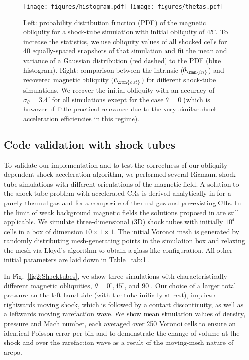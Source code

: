 \documentclass[8pt,a4paper,usenatbib]{mnras}
\newcommand{\AREPO}{{\sc arepo}\xspace}
\begin{document}
\begin{figure*}
\centering
\texttt{[image: figures/histogram.pdf]} 
\texttt{[image: figures/thetas.pdf]} 
\caption{Left: probability distribution function (PDF) of the magnetic obliquity
  for a shock-tube simulation with initial obliquity of $45^\circ$. To increase
  the statistics, we use obliquity values of all shocked cells for 40
  equally-spaced snapshots of that simulation and fit the mean and variance of a
  Gaussian distribution (red dashed) to the PDF (blue histogram).  Right:
  comparison between the intrinsic ($\theta_\rmn{in}$) and recovered magnetic
  obliquity ($\theta_\rmn{out}$) for different shock-tube simulations. We
  recover the initial obliquity with an accuracy of $\sigma_\theta=3.4^\circ$
  for all simulations except for the case $\theta=0$ (which is however of little
  practical relevance due to the very similar shock acceleration efficiencies in
  this regime). }
\label{fig3:statistics}
\end{figure*} 


\subsection{Code validation with shock tubes}

To validate our implementation and to test the correctness of our obliquity
dependent shock acceleration algorithm, we performed several Riemann shock-tube
simulations with different orientations of the magnetic field. A solution to the
shock-tube problem with accelerated CRs is derived analytically in
\citet{2017MNRAS.465.4500P} for a purely thermal gas and for a composite of
thermal gas and pre-existing CRs. In the limit of weak background magnetic
fields the solutions proposed in \citet{2017MNRAS.465.4500P} are still
applicable. We simulate three-dimensional (3D) shock tubes with initially $10^4$
cells in a box of dimension $10\times1\times1$. The initial Voronoi mesh is
generated by randomly distributing mesh-generating points in the simulation box  
and relaxing the mesh via Lloyd's algorithm \citeyearpar{journals/tit/Lloyd82} 
to obtain a glass-like configuration. All other initial parameters are laid down 
in Table~\ref{tab:1}.

In Fig.~\ref{fig2:Shocktubes}, we show three simulations with characteristically
different magnetic obliquities, $\theta = 0^\circ, 45^\circ$, and $ 90^\circ$.
Our choice of a larger total pressure on the left-hand side (with the tube
initially at rest), implies a rightwards moving shock, which is followed by a
contact discontinuity, as well as a leftwards moving rarefaction wave.  We show
mean simulation values of density, pressure and Mach number, each averaged over
250 Voronoi cells to ensure an identical Poisson error per bin and to
demonstrate the change of volume at the shock and over the rarefaction wave as a
result of the moving-mesh nature of \AREPO.
\end{document}
